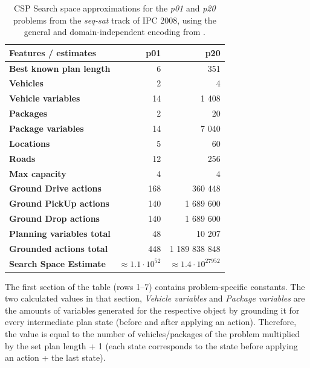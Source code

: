 \begin{table}[tb]
\begin{center}
\begin{tabular}{l||rr}
\textbf{Features / estimates} & \textbf{p01} & \textbf{p20} \\ 
\midrule
\midrule
\textbf{Best known plan length} & 6 & 351 \\ 
\textbf{Vehicles} & 2 & 4 \\ 
\textbf{Vehicle variables} & 14 & 1 408 \\ 
\textbf{Packages} & 2 & 20 \\ 
\textbf{Package variables} & 14 & 7 040 \\ 
\textbf{Locations} & 5 & 60 \\ 
\textbf{Roads} & 12 & 256 \\
\textbf{Max capacity} & 4 & 4 \\ 
\midrule
\textbf{Ground Drive actions} & 168 & 360 448 \\ 
\textbf{Ground PickUp actions} & 140 & 1 689 600 \\ 
\textbf{Ground Drop actions} & 140 & 1 689 600 \\ 
\midrule
\textbf{Planning variables total} & 48 & 10 207 \\ 
\textbf{Grounded actions total} & 448 & 1 189 838 848 \\ 
\textbf{Search Space Estimate} & $\approx 1.1 \cdot 10^{52}$ & $\approx 1.4 \cdot 10^{27 952}$ \\ %
\end{tabular}
\end{center}
\caption[Search space approximations for a na{\"{i}}ve CSP encoding.]{CSP Search space approximations for the \textit{p01} and \textit{p20} problems from the \textit{seq-sat} track of IPC 2008, using the general and domain-independent encoding from \citet[Section~8.3]{Ghallab2004}.}
\label{tab:csp-trivial}
\end{table}

The first section of the table (rows 1--7) contains problem-specific constants.
The two calculated values in that section, \textit{Vehicle variables} and \textit{Package variables} are the amounts of variables generated for the respective
object by grounding it for every intermediate plan state (before and after applying an action). Therefore, the value is equal to the number of vehicles/packages of the problem
multiplied by the set plan length + 1 (each state corresponds to the state before applying an action + the last state).

